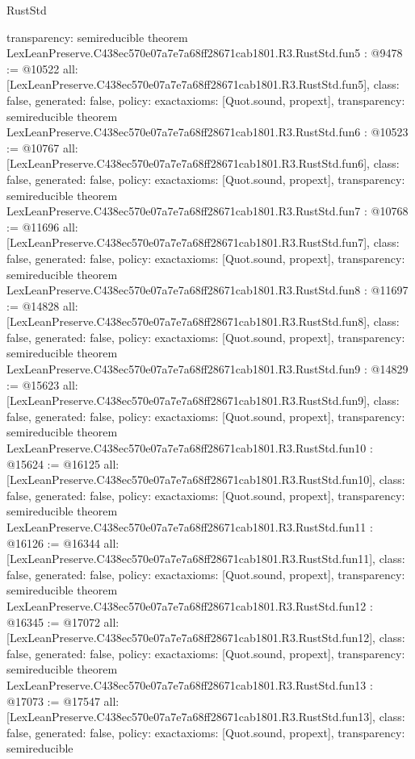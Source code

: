 \begin{lexlean}{RustStd}
\begin{coremodule}
{  transparency: semireducible
}
theorem LexLeanPreserve.C438ec570e07a7e7a68ff28671cab1801.R3.RustStd.fun5 : @9478 := @10522 {
  all: [LexLeanPreserve.C438ec570e07a7e7a68ff28671cab1801.R3.RustStd.fun5],
  class: false,
  generated: false,
  policy: exact{axioms: [Quot.sound, propext]},
  transparency: semireducible
}
theorem LexLeanPreserve.C438ec570e07a7e7a68ff28671cab1801.R3.RustStd.fun6 : @10523 := @10767 {
  all: [LexLeanPreserve.C438ec570e07a7e7a68ff28671cab1801.R3.RustStd.fun6],
  class: false,
  generated: false,
  policy: exact{axioms: [Quot.sound, propext]},
  transparency: semireducible
}
theorem LexLeanPreserve.C438ec570e07a7e7a68ff28671cab1801.R3.RustStd.fun7 : @10768 := @11696 {
  all: [LexLeanPreserve.C438ec570e07a7e7a68ff28671cab1801.R3.RustStd.fun7],
  class: false,
  generated: false,
  policy: exact{axioms: [Quot.sound, propext]},
  transparency: semireducible
}
theorem LexLeanPreserve.C438ec570e07a7e7a68ff28671cab1801.R3.RustStd.fun8 : @11697 := @14828 {
  all: [LexLeanPreserve.C438ec570e07a7e7a68ff28671cab1801.R3.RustStd.fun8],
  class: false,
  generated: false,
  policy: exact{axioms: [Quot.sound, propext]},
  transparency: semireducible
}
theorem LexLeanPreserve.C438ec570e07a7e7a68ff28671cab1801.R3.RustStd.fun9 : @14829 := @15623 {
  all: [LexLeanPreserve.C438ec570e07a7e7a68ff28671cab1801.R3.RustStd.fun9],
  class: false,
  generated: false,
  policy: exact{axioms: [Quot.sound, propext]},
  transparency: semireducible
}
theorem LexLeanPreserve.C438ec570e07a7e7a68ff28671cab1801.R3.RustStd.fun10 : @15624 := @16125 {
  all: [LexLeanPreserve.C438ec570e07a7e7a68ff28671cab1801.R3.RustStd.fun10],
  class: false,
  generated: false,
  policy: exact{axioms: [Quot.sound, propext]},
  transparency: semireducible
}
theorem LexLeanPreserve.C438ec570e07a7e7a68ff28671cab1801.R3.RustStd.fun11 : @16126 := @16344 {
  all: [LexLeanPreserve.C438ec570e07a7e7a68ff28671cab1801.R3.RustStd.fun11],
  class: false,
  generated: false,
  policy: exact{axioms: [Quot.sound, propext]},
  transparency: semireducible
}
theorem LexLeanPreserve.C438ec570e07a7e7a68ff28671cab1801.R3.RustStd.fun12 : @16345 := @17072 {
  all: [LexLeanPreserve.C438ec570e07a7e7a68ff28671cab1801.R3.RustStd.fun12],
  class: false,
  generated: false,
  policy: exact{axioms: [Quot.sound, propext]},
  transparency: semireducible
}
theorem LexLeanPreserve.C438ec570e07a7e7a68ff28671cab1801.R3.RustStd.fun13 : @17073 := @17547 {
  all: [LexLeanPreserve.C438ec570e07a7e7a68ff28671cab1801.R3.RustStd.fun13],
  class: false,
  generated: false,
  policy: exact{axioms: [Quot.sound, propext]},
  transparency: semireducible
}
\end{coremodule}
\end{lexlean}
